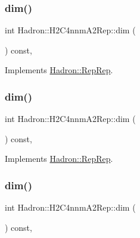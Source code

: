 \subsubsection{\texorpdfstring{dim()}{dim()}\hspace{0.1cm}{\footnotesize\ttfamily [3/5]}}
{\footnotesize\ttfamily int Hadron\+::\+H2\+C4nnm\+A2\+Rep\+::dim (\begin{DoxyParamCaption}{ }\end{DoxyParamCaption}) const\hspace{0.3cm}{\ttfamily [inline]}, {\ttfamily [virtual]}}



Implements \mbox{\hyperlink{structHadron_1_1RepRep_a92c8802e5ed7afd7da43ccfd5b7cd92b}{Hadron\+::\+Rep\+Rep}}.

\mbox{\label{structHadron_1_1H2C4nnmA2Rep_ac698a952586ae314ade8d746e94996fa}} 
\subsubsection{\texorpdfstring{dim()}{dim()}\hspace{0.1cm}{\footnotesize\ttfamily [4/5]}}
{\footnotesize\ttfamily int Hadron\+::\+H2\+C4nnm\+A2\+Rep\+::dim (\begin{DoxyParamCaption}{ }\end{DoxyParamCaption}) const\hspace{0.3cm}{\ttfamily [inline]}, {\ttfamily [virtual]}}



Implements \mbox{\hyperlink{structHadron_1_1RepRep_a92c8802e5ed7afd7da43ccfd5b7cd92b}{Hadron\+::\+Rep\+Rep}}.

\mbox{\label{structHadron_1_1H2C4nnmA2Rep_ac698a952586ae314ade8d746e94996fa}} 
\subsubsection{\texorpdfstring{dim()}{dim()}\hspace{0.1cm}{\footnotesize\ttfamily [5/5]}}
{\footnotesize\ttfamily int Hadron\+::\+H2\+C4nnm\+A2\+Rep\+::dim (\begin{DoxyParamCaption}{ }\end{DoxyParamCaption}) const\hspace{0.3cm}{\ttfamily [inline]}, {\ttfamily [virtual]}}



